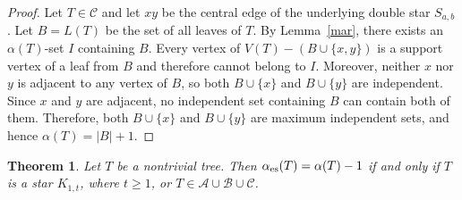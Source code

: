 \documentclass[11pt]{article}
\newtheorem{theorem}{Theorem}
\newcommand{\es}{\alpha_{\rm es}}
\newcommand{\al}{\alpha}
\begin{document}
\begin{proof} 
Let $T\in\mathcal{C}$ and let $xy$ be the central edge of the underlying double star $S_{a,b}$.
Let $B=L(T)$ be the set of all leaves of $T$. By Lemma~\ref{mar}, there exists an $\al(T)$-set
$I$ containing $B$.
Every vertex of $V(T)-(B\cup\{x,y\})$ is a support vertex of a leaf from $B$ and therefore cannot belong to $I$. Moreover, neither $x$ nor $y$ is
adjacent to any vertex of $B$, so both $B\cup\{x\}$ and $B\cup\{y\}$ are independent. Since
$x$ and $y$ are adjacent, no independent set containing $B$ can contain both of them.
Therefore, both $B\cup\{x\}$ and $B\cup\{y\}$ are maximum independent sets, and hence $\al(T)=|B|+1$.
\end{proof}

\begin{theorem}
\label{tree-up}
Let $T$ be a nontrivial tree. Then $\es(T)=\alpha(T)-1$ if and only if $T$ is a star $K_{1,t}$, where $t\ge 1$, or $T\in \mathcal{A}\cup \mathcal{B} \cup \mathcal{C}$.
\end{theorem}
\end{document}
